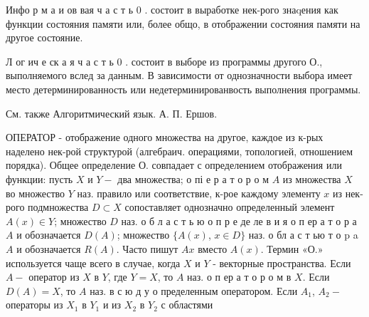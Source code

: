 \documentclass[10pt]{article}
\begin{document}
Инфо р м а и ов вая ч а с т ь 0 . состоит в выработке нек-рого знаqения как функции состояния памяти или, более общо, в отображении состояния памяти на другое состояние.



Л ог ич е ск а я ч а с т ь 0 . состоит в выборе из программы другого О., выполняемого вслед за данным. В зависимости от однозначности выбора имеет место детерминированность или недетерминированвость выполнения программы.



См. также Алгоритмический язык. А. П. Ершов.



ОПЕРАТОР - отображение одного множества на другое, каждое из к-рых наделено нек-рой структурой (алгебраич. операциями, топологией, отношением порядка). Общее определение О. совпадает с определением отображения или функции: пусть $X$ и $Y-$ два множества; о пі е р а т о р о м $A$ из множества $X$ во множество $Y$ наз. правило или соответствие, к-рое каждому элементу $x$ из нек-рого подмножества $D \subset X$ сопоставляет однозначно определенный элемент $A(x) \in Y$; множество $D$ наз. о б л а с т ь ю о п р е де ле в и я о п ер а т о р а $A$ и обозначается $D(A)$; множество $\{A(x)$, $x \in D\}$ наз. о бл а с т ью т о $\mathrm{p}$ a $A$ и обозначается $R(A)$. Часто пишут $A x$ вместо $A(x)$. Термин «О.» используется чаще всего в случае, когда $X$ и $Y$ - векторные пространства. Если $A-$ оператор из $X$ в $Y$, где $Y=X$, то $A$ наз. о п ер а т о р о м в $X$. Если $D(A)=X$, то $A$ наз. в с ю д у о пределенным оператором. Если $A_{1}$, $A_{2}-$ операторы из $X_{1}$ в $Y_{1}$ и из $X_{2}$ в $Y_{2}$ с областями
\end{document}
